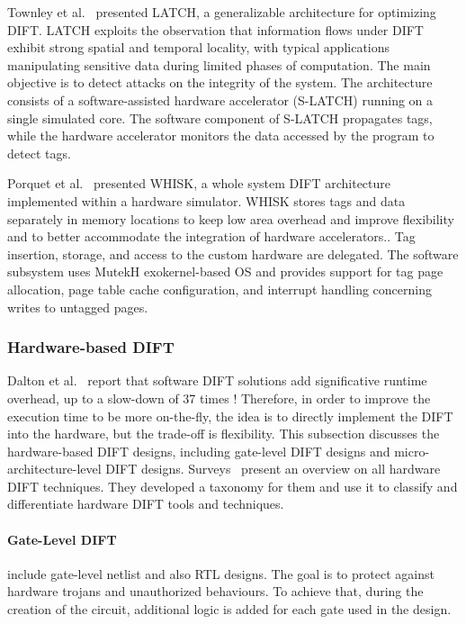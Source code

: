 Townley et al.~\cite{TKPAY-19-micro} presented LATCH, a generalizable architecture for optimizing DIFT. 
LATCH exploits the observation that information flows under DIFT exhibit strong spatial and temporal locality, with typical applications manipulating sensitive data during limited phases of computation. The main objective is to detect attacks on the integrity of the system. The architecture consists of a software-assisted hardware accelerator (S-LATCH) running on a single simulated core. The software component of S-LATCH propagates tags, while the hardware accelerator monitors the data accessed by the program to detect tags. 

Porquet et al.~\cite{PS-13-codes} presented WHISK, a whole system DIFT architecture implemented within a hardware simulator. WHISK stores tags and data separately in memory locations to keep low area overhead and improve flexibility and to better accommodate the integration of hardware accelerators.. Tag insertion, storage, and access to the custom hardware are delegated. The software subsystem uses MutekH exokernel-based OS and provides support for tag page allocation, page table cache configuration, and interrupt handling concerning writes to untagged pages.


\subsubsection{Hardware-based DIFT}
Dalton et al.~\cite{DKK-07-sigarch} report that software DIFT solutions add significative runtime overhead, up to a slow-down of 37 times ! Therefore, in order to improve the execution time to be more on-the-fly, the idea is to directly implement the DIFT into the hardware, but the trade-off is flexibility.
This subsection discusses the hardware-based DIFT designs, including gate-level DIFT designs and micro-architecture-level DIFT designs. Surveys~\cite{HAK-21-acmcsur,BSMCVEJCO-21-acmcsur} present an overview on all hardware DIFT techniques. They developed a taxonomy for them and use it to classify and differentiate hardware DIFT tools and techniques.

\paragraph{Gate-Level DIFT} include gate-level netlist and also RTL designs. The goal is to protect against hardware trojans and unauthorized behaviours. To achieve that, during the creation of the circuit, additional logic is added for each gate used in the design.

